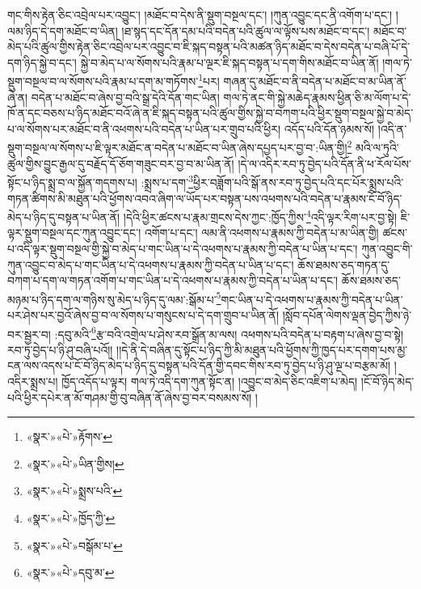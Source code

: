 གང་གིས་རྟེན་ཅིང་འབྲེལ་པར་འབྱུང་། །མཐོང་བ་དེས་ནི་སྡུག་བསྔལ་དང་། །ཀུན་འབྱུང་དང་ནི་འགོག་པ་དང་། །ལམ་ཉིད་དེ་དག་མཐོང་བ་ཡིན། །ཐ་སྙད་དང་དོན་དམ་པའི་བདེན་པའི་ཚུལ་ལ་ལྟོས་པས་མཐོང་བ་དང་། མཐོང་བ་མེད་པའི་ཚུལ་གྱིས་རྟེན་ཅིང་འབྲེལ་པར་འབྱུང་བ་ཇི་སྐད་བསྟན་པའི་མཚན་ཉིད་མཐོང་བ་དེས་བདེན་པ་བཞི་པོ་དེ་དག་ཉིད་སྐྱེ་བ་དང་། སྐྱེ་བ་མེད་པ་ལ་སོགས་པའི་རྣམ་པ་ལྔར་ཇི་སྐད་བསྟན་པ་དག་གིས་མཐོང་བ་ཡིན་ནོ། །གལ་ཏེ་སྡུག་བསྔལ་བ་ལ་སོགས་པའི་རྣམ་པ་དག་མ་གཏོགས་\footnote{«སྣར་»«པེ་»རྟོགས་}པར། གཞན་དུ་མཐོང་བ་ནི་བདེན་པ་མཐོང་བ་མ་ཡིན་ནོ་ཞེ་ན། བདེན་པ་མཐོང་བ་ཞེས་བྱ་བའི་སྒྲ་དེའི་དོན་གང་ཡིན། གལ་ཏེ་ནང་གི་སྐྱེ་མཆེད་རྣམས་ཕྱིན་ཅི་མ་ལོག་པ་དེ་ཁོ་ན་དང་བཅས་པ་ཉིད་མཐོང་བའོ་ཞེ་ན་ཇི་སྐད་བསྟན་པའི་ཚུལ་གྱིས་སྐྱེ་བ་བཀག་པའི་ཕྱིར་སྡུག་བསྔལ་སྐྱེ་བ་མེད་པ་ལ་སོགས་པར་མཐོང་བ་ནི་འཕགས་པའི་བདེན་པ་ཡིན་པར་གྲུབ་པའི་ཕྱིར། འདོད་པའི་དོན་ཉམས་སོ། །འདི་ན་སྡུག་བསྔལ་ལ་སོགས་པ་ཇི་ལྟར་མཐོང་ན་བདེན་པ་མཐོང་བ་ཡིན་ཞེས་དཔྱད་པར་བྱ་བ་:ཡིན་གྱི།\footnote{«སྣར་»«པེ་»ཡིན་གྱིས།} མའི་ལ་ཏུའི་ཚུལ་གྱིས་བྱུང་རྒྱལ་དུ་བརྗོད་དོ་ཅོག་གཟུང་བར་བྱ་བ་མ་ཡིན་ནོ། །དེ་ལ་འདིར་རབ་ཏུ་བྱེད་པའི་དོན་ནི་ཕ་རོལ་པོས་སྟོང་པ་ཉིད་སྨྲ་བ་ལ་སྐྱོན་གདགས་པ། :སྨྲས་པ་དག་\footnote{«སྣར་»«པེ་»སྨྲས་པའི་}ཕྱིར་བཟློག་པའི་སྒོ་ནས་རབ་ཏུ་བྱེད་པའི་དང་པོར་སྨྲས་པའི་གཏན་ཚིགས་མི་མཐུན་པའི་ཕྱོགས་འབའ་ཞིག་ལ་ཡོད་པར་བསྟན་པས་འཕགས་པའི་བདེན་པ་རྣམས་ངོ་བོ་ཉིད་མེད་པ་ཉིད་དུ་བསྟན་པ་ཡིན་ནོ། །དེའི་ཕྱིར་ཚངས་པ་རྣམ་གྲངས་དེས་ཀྱང་:ཁྱོད་ཀྱིས་\footnote{«སྣར་»«པེ་»ཁྱོད་ཀྱི་}འདི་ལྟར་རིག་པར་བྱ་སྟེ། ཇི་ལྟར་སྡུག་བསྔལ་དང་ཀུན་འབྱུང་དང་། འགོག་པ་དང་། ལམ་ནི་འཕགས་པ་རྣམས་ཀྱི་བདེན་པ་མ་ཡིན་གྱི། ཚངས་པ་འདི་ལྟར་སྡུག་བསྔལ་གྱི་སྐྱེ་བ་མེད་པ་གང་ཡིན་པ་དེ་འཕགས་པ་རྣམས་ཀྱི་བདེན་པ་ཡིན་པ་དང་། ཀུན་འབྱུང་གི་ཀུན་འབྱུང་བ་མེད་པ་གང་ཡིན་པ་དེ་འཕགས་པ་རྣམས་ཀྱི་བདེན་པ་ཡིན་པ་དང་། ཆོས་ཐམས་ཅད་གཏན་དུ་བཀག་པ་དག་ལ་གཏན་འགོག་པ་གང་ཡིན་པ་དེ་འཕགས་པ་རྣམས་ཀྱི་བདེན་པ་ཡིན་པ་དང་། ཆོས་ཐམས་ཅད་མཉམ་པ་ཉིད་དག་ལ་གཉིས་སུ་མེད་པ་ཉིད་དུ་ལམ་:སྒོམ་པ་\footnote{«སྣར་»«པེ་»བསྒོམ་པ་}གང་ཡིན་པ་དེ་འཕགས་པ་རྣམས་ཀྱི་བདེན་པ་ཡིན་པར་ཤེས་པར་བྱའོ་ཞེས་བྱ་བ་ལ་སོགས་པ་གསུངས་པ་དེ་དག་གྲུབ་པ་ཡིན་ནོ། །སློབ་དཔོན་ལེགས་ལྡན་བྱེད་ཀྱིས་ཉེ་བར་སྦྱར་བ། :དབུ་མའི་\footnote{«སྣར་»«པེ་»དབུ་མ་}རྩ་བའི་འགྲེལ་པ་ཤེས་རབ་སྒྲོན་མ་ལས། འཕགས་པའི་བདེན་པ་བརྟག་པ་ཞེས་བྱ་བ་སྟེ། རབ་ཏུ་བྱེད་པ་ཉི་ཤུ་བཞི་པའོ།། །།དེ་ནི་དེ་བཞིན་དུ་སྟོང་པ་ཉིད་ཀྱི་མི་མཐུན་པའི་ཕྱོགས་ཀྱི་ཁྱད་པར་དགག་པས་མྱ་ངན་ལས་འདས་པ་ངོ་བོ་ཉིད་མེད་པ་ཉིད་དུ་བསྟན་པའི་དོན་གྱི་དབང་གིས་རབ་ཏུ་བྱེད་པ་ཉི་ཤུ་ལྔ་པ་བརྩམ་མོ། །འདིར་སྨྲས་པ། ཁྱོད་འདོད་པ་ལྟར། གལ་ཏེ་འདི་དག་ཀུན་སྟོང་ན། །འབྱུང་བ་མེད་ཅིང་འཇིག་པ་མེད། །ངོ་བོ་ཉིད་མེད་པའི་ཕྱིར་དཔེར་ན་མོ་གཤམ་གྱི་བུ་བཞིན་ནོ་ཞེས་བྱ་བར་བསམས་སོ། །
